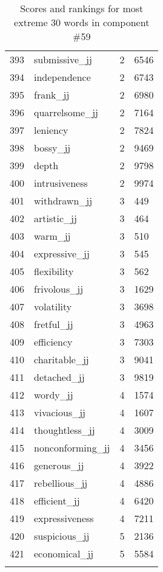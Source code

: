 \begin{longtable}[!htbp]{| rlr@{.}l |}
    393 & submissive\_jj & 2 & 6546 \\
    394 & independence & 2 & 6743 \\
    395 & frank\_jj & 2 & 6980 \\
    396 & quarrelsome\_jj & 2 & 7164 \\
    397 & leniency & 2 & 7824 \\
    398 & bossy\_jj & 2 & 9469 \\
    399 & depth & 2 & 9798 \\
    400 & intrusiveness & 2 & 9974 \\
    401 & withdrawn\_jj & 3 & 449 \\
    402 & artistic\_jj & 3 & 464 \\
    403 & warm\_jj & 3 & 510 \\
    404 & expressive\_jj & 3 & 545 \\
    405 & flexibility & 3 & 562 \\
    406 & frivolous\_jj & 3 & 1629 \\
    407 & volatility & 3 & 3698 \\
    408 & fretful\_jj & 3 & 4963 \\
    409 & efficiency & 3 & 7303 \\
    410 & charitable\_jj & 3 & 9041 \\
    411 & detached\_jj & 3 & 9819 \\
    412 & wordy\_jj & 4 & 1574 \\
    413 & vivacious\_jj & 4 & 1607 \\
    414 & thoughtless\_jj & 4 & 3009 \\
    415 & nonconforming\_jj & 4 & 3456 \\
    416 & generous\_jj & 4 & 3922 \\
    417 & rebellious\_jj & 4 & 4886 \\
    418 & efficient\_jj & 4 & 6420 \\
    419 & expressiveness & 4 & 7211 \\
    420 & suspicious\_jj & 5 & 2136 \\
    421 & economical\_jj & 5 & 5584 \\
    \hline
    \caption{Scores and rankings for most extreme 30 words in component \#59} \\
\end{longtable}
